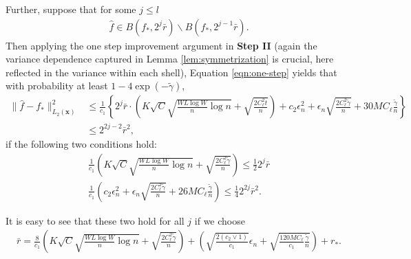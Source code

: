\documentclass[11pt]{article}
\numberwithin{equation}{section}
\theoremstyle{definition}
\newcommand{\bx}{\bm{x}}
\newcommand{\gt}{\tilde{\gamma}}
\begin{document}
\begin{appendices}
Further, suppose that for some $j \leq l$
\begin{align}
	\hat{f} \in B(f_*, 2^{j} \bar{r}) \backslash B(f_*, 2^{j-1} \bar{r}). 
\end{align}
Then applying the one step improvement argument in {\bf Step II} (again the variance dependence captured in Lemma \ref{lem:symmetrization} is crucial, here reflected in the variance within each shell), Equation \eqref{eqn:one-step} yields that with probability at least $1 - 4 \exp(-\gt)$,
\begin{align*}
	\| \hat{f} - f_* \|_{L_2(\bx)}^2 &\leq  \frac{1}{c_1} \left\{ 2^j \bar{r} \cdot \left( K\sqrt{C} \sqrt{ \frac{W L \log W}{n}\log n}  + \sqrt{\frac{2 C_\ell^2 t}{n}} \right) + c_2 \epsilon_n^2 + \epsilon_n \sqrt{\frac{2C_\ell^2 \gt }{n}}   + 30 M C_\ell \frac{\gt}{n} \right\} \\
	& \leq 2^{2j-2} \bar{r}^2,
\end{align*}
if the following two conditions hold:
\begin{align*}
	  \frac{1}{c_1}  \left( K\sqrt{C} \sqrt{ \frac{W L \log W}{n}\log n} + \sqrt{\frac{2 C_\ell^2 \gt}{n}} \right)  \leq \frac{1}{2} 2^{j}\bar{r}   	\\
	  \frac{1}{c_1}\left( c_2 \epsilon_n^2 + \epsilon_n \sqrt{\frac{2C_\ell^2 \gt }{n}}   + 26 MC_\ell \frac{\gt}{n}  \right) \leq \frac{1}{4} 2^{2j}\bar{r}^2.
\end{align*}

It is easy to see that these two hold for all $j$ if we choose 
\begin{align}
	\label{eqn:r_bar}
	\bar{r} = \frac{8}{c_1}  \left( K\sqrt{C} \sqrt{ \frac{W L \log W}{n}\log n}  + \sqrt{\frac{2 C_\ell^2 \gt}{n}} \right) + \left( \sqrt{\frac{2 (c_2 \vee 1)}{c_1}} \epsilon_n + \sqrt{\frac{120 M C_\ell}{c_1} \frac{\gt}{n}} \right) + r_* .
\end{align}



\end{appendices}
\end{document}
